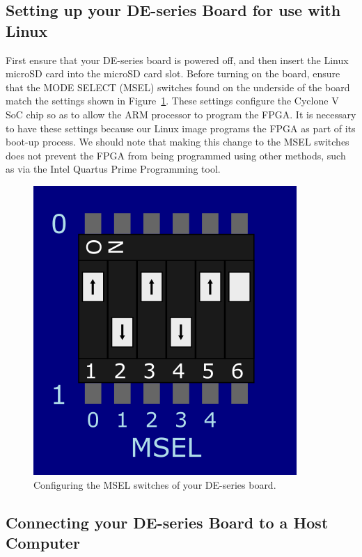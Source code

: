 \documentclass[11pt, twoside, pdftex]{article}
\begin{document}
\begin{enumerate}
\end{enumerate}

\subsection{Setting up your DE-series Board for use with Linux}

First ensure that your DE-series board is powered off, and then insert the Linux 
microSD card into the microSD card slot. Before turning on the board, ensure that the
MODE SELECT (MSEL) switches found on the underside of the board match the settings shown 
in Figure~\ref{fig:msel}. These settings configure the Cyclone V SoC chip so as to allow the 
ARM processor to program the FPGA. It is necessary to have these settings because our Linux 
image programs the FPGA as part of its boot-up process. We should note that making this
change to the MSEL switches does not prevent the FPGA from being programmed using other
methods, such as via the Intel Quartus Prime Programming tool.

\begin{figure} [H]
\begin{center}
\includegraphics[scale = 1.00]{figures/MSEL.png}
\end{center}
\caption{Configuring the MSEL switches of your DE-series board.}
\label{fig:msel}
\end{figure}

\subsection{Connecting your DE-series Board to a Host Computer}
\end{document}
